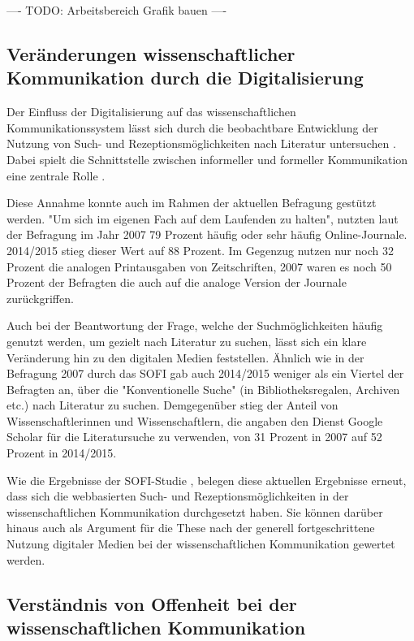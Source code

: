 ---- TODO: Arbeitsbereich Grafik bauen ----

\subsection{Veränderungen wissenschaftlicher Kommunikation durch die Digitalisierung}

Der Einfluss der Digitalisierung auf das wissenschaftlichen Kommunikationssystem lässt sich durch die beobachtbare Entwicklung der Nutzung von Such- und Rezeptionsmöglichkeiten nach Literatur untersuchen \cite{Hanekop_2014}. Dabei spielt die Schnittstelle zwischen informeller und formeller Kommunikation eine zentrale Rolle \cite{Hanekop_2014}.

Diese Annahme konnte auch im Rahmen der aktuellen Befragung gestützt werden. "Um sich im eigenen Fach auf dem Laufenden zu halten", nutzten laut der Befragung im Jahr 2007 79 Prozent häufig oder sehr häufig Online-Journale. 2014/2015 stieg dieser Wert auf 88 Prozent. Im Gegenzug nutzen nur noch 32 Prozent die analogen Printausgaben von Zeitschriften, 2007 waren es noch 50 Prozent der Befragten die auch auf die analoge Version der Journale zurückgriffen.

Auch bei der Beantwortung der Frage, welche der Suchmöglichkeiten häufig genutzt werden, um gezielt nach Literatur zu suchen, lässt sich ein klare Veränderung hin zu den digitalen Medien feststellen. Ähnlich wie in der Befragung 2007 durch das SOFI gab auch 2014/2015 weniger als ein Viertel der Befragten an, über die "Konventionelle Suche" (in Bibliotheksregalen, Archiven etc.) nach Literatur zu suchen. Demgegenüber stieg der Anteil von Wissenschaftlerinnen und Wissenschaftlern, die angaben den Dienst Google Scholar für die Literatursuche zu verwenden, von 31 Prozent in 2007 auf 52 Prozent in 2014/2015.

Wie die Ergebnisse der SOFI-Studie \cite{Hanekop_2014}, belegen diese aktuellen Ergebnisse erneut, dass sich die webbasierten Such- und Rezeptionsmöglichkeiten in der wissenschaftlichen Kommunikation durchgesetzt haben. Sie können darüber hinaus auch als Argument für die These nach der generell fortgeschrittene Nutzung digitaler Medien bei der wissenschaftlichen Kommunikation gewertet werden.

\subsection{Verständnis von Offenheit bei der wissenschaftlichen Kommunikation}


